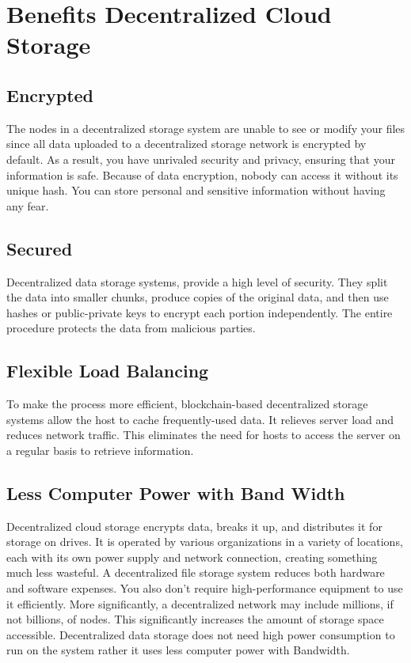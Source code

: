 \section{Benefits Decentralized Cloud Storage}

\subsection{Encrypted}

The nodes in a decentralized storage system are unable to see or modify your files since all data uploaded to a decentralized storage network is encrypted by default. As a result, you have unrivaled security and privacy, ensuring that your information is safe. Because of data encryption, nobody can access it without its unique hash. You can store personal and sensitive information without having any fear.

\subsection{Secured}

Decentralized data storage systems, provide a high level of security. They split the data into smaller chunks, produce copies of the original data, and then use hashes or public-private keys to encrypt each portion independently. The entire procedure protects the data from malicious parties.


\subsection{Flexible Load Balancing}

To make the process more efficient, blockchain-based decentralized storage systems allow the host to cache frequently-used data. It relieves server load and reduces network traffic. This eliminates the need for hosts to access the server on a regular basis to retrieve information.

\subsection{Less Computer Power with Band Width}

Decentralized cloud storage encrypts data, breaks it up, and distributes it for storage on drives. It is operated by various organizations in a variety of locations, each with its own power supply and network connection, creating something much less wasteful. A decentralized file storage system reduces both hardware and software expenses. You also don’t require high-performance equipment to use it efficiently.  More significantly, a decentralized network may include millions, if not billions, of nodes. This significantly increases the amount of storage space accessible. Decentralized data storage does not need high power consumption to run on the system rather it uses less computer power with Bandwidth.

